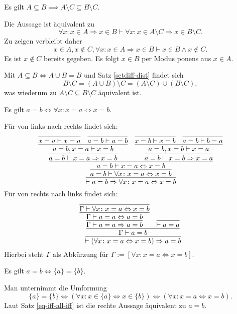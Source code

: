 \begin{Satz}\label{subseteq-diff}
Es gilt $A\subseteq B\implies A\setminus C\subseteq B\setminus C$.
\end{Satz}
\begin{Beweis}[Beweis 1]
Die Aussage ist äquivalent zu
\[\forall x\colon x\in A\Rightarrow x\in B\vdash \forall x\colon x\in A\setminus C\Rightarrow x\in B\setminus C.\]
Zu zeigen verbleibt daher
\[x\in A, x\notin C, \forall x\colon x\in A\Rightarrow x\in B\vdash x\in B\land x\notin C.\]
Es ist $x\notin C$ bereits gegeben. Es folgt $x\in B$ per Modus ponens aus $x\in A$.\,\qedsymbol
\end{Beweis}
\begin{Beweis}[Beweis 2]
Mit $A\subseteq B\Leftrightarrow A\cup B=B$ und Satz \ref{setdiff-dist} findet sich
\[B\setminus C = (A\cup B)\setminus C = (A\setminus C)\cup (B\setminus C),\]
was wiederum zu $A\setminus C\subseteq B\setminus C$ äquivalent ist.\,\qedsymbol
\end{Beweis}

\begin{Satz}\label{eq-iff-all-iff}
Es gilt $a=b\iff \forall x\colon x=a\Leftrightarrow x=b$.
\end{Satz}

\begin{Beweis}
Für von links nach rechts findet sich:
\[
\infer{\vdash a=b\Rightarrow\forall x\colon x=a\Leftrightarrow x=b}{
  \infer{a=b\vdash\forall x\colon x=a\Leftrightarrow x=b}{
    \infer{a=b\vdash x=a\Leftrightarrow x=b}{
      \infer{a=b\vdash x=a\Rightarrow x=b}{
        \infer{a=b,x=a\vdash x=b}{
          \infer{x=a\vdash x=a}{} & \infer{a=b\vdash a=b}{}}}
    & \infer{a=b\vdash x=b\Rightarrow x=a}{
        \infer{a=b,x=b\vdash x=a}{
          \infer{x=b\vdash x=b}{} & \infer{a=b\vdash b=a}{}}}}}}
\]
Für von rechts nach links findet sich:
\[
\infer{\vdash(\forall x\colon x=a\Leftrightarrow x=b)\Rightarrow a=b}{
  \infer{\Gamma\vdash a=b}{
    \infer{\Gamma\vdash a=a\Rightarrow a=b}{
      \infer{\Gamma\vdash a=a\Leftrightarrow a=b}{
        \infer{\Gamma\vdash\forall x\colon x=a\Leftrightarrow x=b}{}}}
  & \infer{\vdash a=a}{}}}
\]
Hierbei steht $\Gamma$ als Abkürzung für
$\Gamma:=[\forall x\colon x=a\Leftrightarrow x=b]$.\,\qedsymbol
\end{Beweis}

\begin{Satz}
Es gilt $a=b\iff\{a\}=\{b\}$.
\end{Satz}

\begin{Beweis}
Man unternimmt die Umformung
\[\{a\}=\{b\}\iff (\forall x\colon x\in\{a\}\Leftrightarrow x\in\{b\})
\iff (\forall x\colon x=a\Leftrightarrow x=b).\]
Laut Satz \ref{eq-iff-all-iff} ist die rechte Aussage
äquivalent zu $a=b$.\;\qedsymbol
\end{Beweis}

